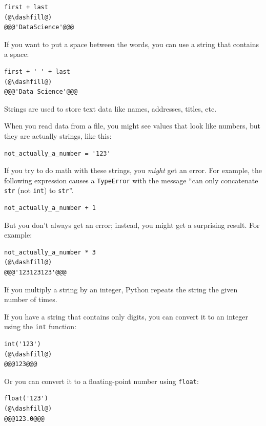 \begin{lstlisting}[]
first + last
(@\dashfill@)
@@@'DataScience'@@@
\end{lstlisting}

If you want to put a space between the words, you can use a string that
contains a space:

\begin{lstlisting}[]
first + ' ' + last
(@\dashfill@)
@@@'Data Science'@@@
\end{lstlisting}

Strings are used to store text data like names, addresses, titles, etc.

When you read data from a file, you might see values that look like
numbers, but they are actually strings, like this:

\begin{lstlisting}[]
not_actually_a_number = '123'
\end{lstlisting}

If you try to do math with these strings, you \emph{might} get an error.
For example, the following expression causes a
\passthrough{\lstinline!TypeError!} with the message ``can only
concatenate \passthrough{\lstinline!str!} (not
\passthrough{\lstinline!int!}) to \passthrough{\lstinline!str!}''.

\begin{lstlisting}
not_actually_a_number + 1
\end{lstlisting}

But you don't always get an error; instead, you might get a surprising
result. For example:

\begin{lstlisting}[]
not_actually_a_number * 3
(@\dashfill@)
@@@'123123123'@@@
\end{lstlisting}

If you multiply a string by an integer, Python repeats the string the
given number of times.

If you have a string that contains only digits, you can convert it to an
integer using the \passthrough{\lstinline!int!} function:

\begin{lstlisting}[]
int('123')
(@\dashfill@)
@@@123@@@
\end{lstlisting}

Or you can convert it to a floating-point number using
\passthrough{\lstinline!float!}:

\begin{lstlisting}[]
float('123')
(@\dashfill@)
@@@123.0@@@
\end{lstlisting}

